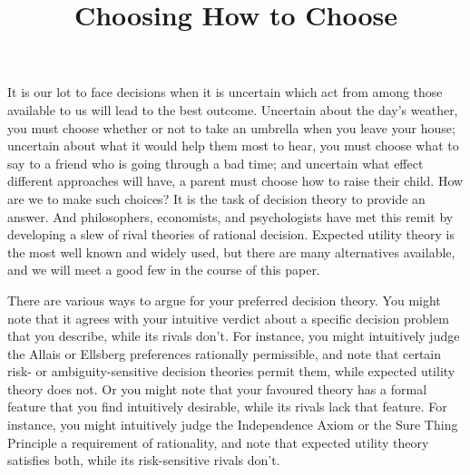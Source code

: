 \documentclass[a4paper]{article}
\newcommand{\todoinfo}[2][]{\todo[backgroundcolor=orange!80,bordercolor=black,linecolor=gray!80, #1,inline,caption={}]{#2}}
\newenvironment{CCM rewritten}
{\begingroup\color{blue}} %
{\endgroup}              %
\begin{document}
\title{Choosing How to Choose}
\author{}%
\maketitle



\begin{comment}
	\todoinfo[inline]{CCM
	
Todo/questions:
\begin{enumerate}
	\item Refs to Teddy?
	\item Indep stuff
	\item imprecise nu and ead?
	\item Add a bit more explicit proof of result for maximality stuff, it's not immediate and I need to think it through to get the non-independence version clear in my head!
	\item ...?
\end{enumerate}
}
\end{comment}


It is our lot to face decisions when it is uncertain which act from among those available to us will lead to the best outcome. Uncertain about the day's weather, you must choose whether or not to take an umbrella when you leave your house; uncertain about what it would help them most to hear, you must choose what to say to a friend who is going through a bad time; and uncertain what effect different approaches will have, a parent must choose how to raise their child. How are we to make such choices? It is the task of decision theory to provide an answer. And philosophers, economists, and psychologists have met this remit by developing a slew of rival theories of rational decision. Expected utility theory is the most well known and widely used, but there are many alternatives available, and we will meet a good few in the course of this paper.

There are various ways to argue for your preferred decision theory. You might note that it agrees with your intuitive verdict about a specific decision problem that you describe, while its rivals don't. For instance, you might intuitively judge the Allais or Ellsberg preferences rationally permissible, and note that certain risk- or ambiguity-sensitive decision theories permit them, while expected utility theory does not. Or you might note that your favoured theory has a formal feature that you find intuitively desirable, while its rivals lack that feature. For instance, you might intuitively judge the Independence Axiom or the Sure Thing Principle a requirement of rationality, and note that expected utility theory satisfies both, while its risk-sensitive rivals don't.
	
\end{document}
